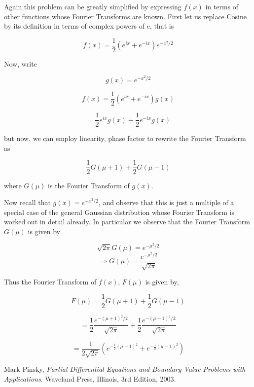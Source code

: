 \documentclass[12pt]{article}
\begin{document}
Again this problem can be greatly simplified by expressing $f(x)$ in terms of other functions whose Fourier Transforms are known. First let us replace Cosine by its definition in terms of complex powers of e, that is

\[f(x)=\frac{1}{2}\left(e^{i x}+e^{-i x}\right)e^{-x^2/2}\]

Now, write 

\[g(x)=e^{-x^2/2}\]

\[f(x)=\frac{1}{2}\left(e^{i x}+e^{-i x}\right)g(x)\]

\[=\frac{1}{2}e^{i x}g(x)+\frac{1}{2}e^{-i x}g(x)\]

but now, we can employ linearity, phase factor \cite[Page 280]{pinsky} to rewrite the Fourier Transform as

\[\frac{1}{2}G(\mu+1)+\frac{1}{2}G(\mu-1)\]

where $G(\mu)$ is the Fourier Transform of $g(x)$.

Now recall that $g(x)=e^{-x^2/2}$, and observe that this is just a multiple of a special case of the general Gaussian distribution whose Fourier Transform is worked out in detail \cite[Page 282]{pinsky} already. In particular we observe that the Fourier Transform $G(\mu)$ is given by

\[\sqrt{2\pi}G(\mu)=e^{-\mu^2/2}\]
\[\Rightarrow G(\mu)=\frac{e^{-\mu^2/2}}{\sqrt{2\pi}}\]


Thus the Fourier Transform of $f(x)$, $F(\mu)$ is given by,

\[F(\mu)=\frac{1}{2}G(\mu+1)+\frac{1}{2}G(\mu-1)\]

\[=\frac{1}{2}\frac{e^{-(\mu+1)^2/2}}{\sqrt{2\pi}}+\frac{1}{2}\frac{e^{-(\mu-1)^2/2}}{\sqrt{2\pi}}\]

\[=\frac{1}{2\sqrt{2\pi}}\left(e^{-\frac{1}{2}(\mu+1)^2}+e^{-\frac{1}{2}(\mu-1)^2}\right)\]



\begin{thebibliography}{9}

	  Mark Pinsky,
	  \emph{Partial Differential Equations and Boundary Value Problems with Applications}.
	  Waveland Press, Illinois,
	  3rd Edition,
	  2003.

\end{thebibliography}
\end{document}
